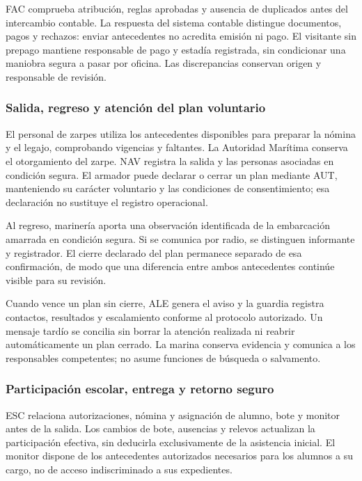 FAC comprueba atribución, reglas aprobadas y ausencia
de duplicados antes del intercambio contable.
La respuesta del sistema contable distingue documentos,
pagos y rechazos: enviar antecedentes no acredita
emisión ni pago. El visitante sin prepago mantiene
responsable de pago y estadía registrada, sin condicionar
una maniobra segura a pasar por oficina. Las discrepancias
conservan origen y responsable de revisión.

\subsubsection{Salida, regreso y atención del plan voluntario}

El personal de zarpes utiliza los antecedentes disponibles
para preparar la nómina y el legajo, comprobando vigencias
y faltantes. La Autoridad Marítima conserva el otorgamiento
del zarpe. NAV registra la salida y las personas asociadas
en condición segura. El armador puede declarar o cerrar
un plan mediante AUT, manteniendo su carácter voluntario
y las condiciones de consentimiento; esa declaración
no sustituye el registro operacional.

Al regreso, marinería aporta una observación identificada
de la embarcación amarrada en condición segura. Si se
comunica por radio, se distinguen informante y registrador.
El cierre declarado del plan permanece separado de
esa confirmación, de modo que una diferencia entre
ambos antecedentes continúe visible para su revisión.

Cuando vence un plan sin cierre, ALE genera el aviso
y la guardia registra contactos, resultados y escalamiento
conforme al protocolo autorizado. Un mensaje tardío
se concilia sin borrar la atención realizada ni reabrir
automáticamente un plan cerrado. La marina conserva
evidencia y comunica a los responsables competentes;
no asume funciones de búsqueda o salvamento.

\subsubsection{Participación escolar, entrega y retorno seguro}

ESC relaciona autorizaciones, nómina y asignación
de alumno, bote y monitor antes de la salida.
Los cambios de bote, ausencias y relevos actualizan
la participación efectiva, sin deducirla exclusivamente
de la asistencia inicial. El monitor dispone de
los antecedentes autorizados necesarios para los alumnos
a su cargo, no de acceso indiscriminado a sus expedientes.

